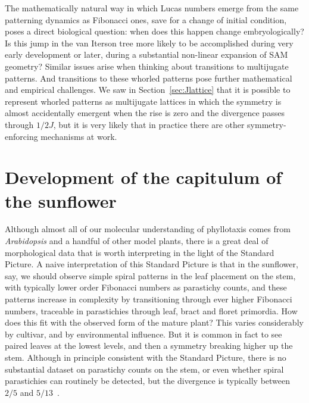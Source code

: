 The mathematically natural way in which Lucas numbers emerge from the same patterning dynamics as Fibonacci ones, save for a change of initial condition, poses a direct biological question: when does this happen change embryologically?  Is this jump in the van Iterson tree more likely to be accomplished during very early development or later, during a substantial non-linear expansion of SAM geometry? Similar issues arise when thinking about transitions to multijugate patterns. And transitions to these whorled patterns pose further mathematical and empirical challenges. We saw in Section~\ref{sec:Jlattice} that it is possible to represent whorled patterns as multijugate lattices in which the symmetry is almost accidentally emergent when the  rise is zero and the divergence passes through $1/2J$, but it is very likely that in practice there are other symmetry-enforcing mechanisms at work. 



\section{Development of the capitulum of the sunflower}
Although almost all of our molecular understanding of phyllotaxis comes from \textit{Arabidopsis} and a handful of other model plants, there is a great deal of morphological data that is worth interpreting in the light of the Standard Picture. 
A naive interpretation of this Standard Picture is that in the sunflower, say, we should observe simple spiral patterns in the leaf placement on the stem, with typically lower order Fibonacci numbers as parastichy counts, and these patterns increase in complexity by transitioning through ever higher Fibonacci numbers, traceable in parastichies through leaf, bract and floret primordia. How does this fit with the observed form of the mature plant? This varies considerably by cultivar, and by environmental influence.
But it is common in fact to see paired leaves at the lowest levels, and then a symmetry breaking higher up the stem. Although in principle consistent with the Standard Picture, there is no substantial dataset on parastichy counts on the stem, or even whether spiral parastichies can routinely be detected, but the divergence is typically between $2/5$ and $5/13$~\autocite{churchRelationPhyllotaxisMechanical1904}.  

